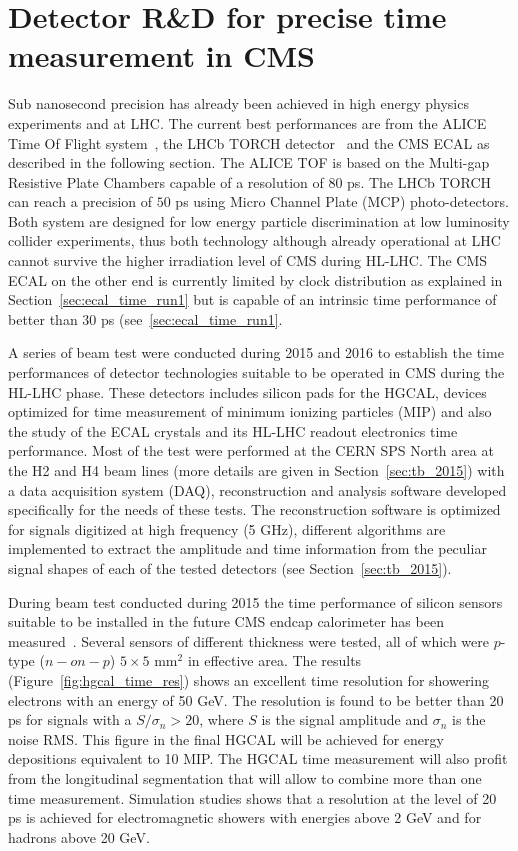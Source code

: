 \clearpage
\section{Detector R\&D for precise time measurement in CMS}
\label{sec:tming_rnd}
Sub nanosecond precision has already been achieved in high energy physics experiments and at LHC.
The current best performances are from the ALICE Time Of Flight system~\cite{alice_tof}, the LHCb TORCH
detector~\cite{lhcb_torch} and the CMS ECAL as described in the following section. The ALICE TOF is
based on the Multi-gap Resistive Plate Chambers capable of a resolution of $80$ ps. The LHCb TORCH
can reach a precision of $50$ ps using Micro Channel Plate (MCP) photo-detectors. Both system are
designed for low energy particle discrimination at low luminosity collider experiments, thus both technology
although already operational at LHC cannot survive the higher irradiation level of CMS during HL-LHC.
The CMS ECAL on the other end is currently limited by clock distribution as explained in Section~\ref{sec:ecal_time_run1}
but is capable of an intrinsic time performance of better than $30$ ps (see~\ref{sec:ecal_time_run1}.

A series of beam test were conducted during 2015 and 2016 to establish the time performances of detector
technologies suitable to be operated in CMS during the HL-LHC phase. These detectors includes silicon
pads for the HGCAL, devices optimized for time measurement of minimum ionizing particles (MIP) and also the study of
the ECAL \PbWO crystals and its HL-LHC readout electronics time performance. Most of the test were performed at
the CERN SPS North area at the H2 and H4 beam lines (more details are given in Section~\ref{sec:tb_2015}) with
a data acquisition system (DAQ), reconstruction and analysis software developed specifically for the needs of
these tests. The reconstruction software is optimized for signals digitized at high frequency (5 GHz),
different algorithms are implemented to extract the amplitude and time information from the peculiar signal shapes of
each of the tested detectors (see Section~\ref{sec:tb_2015}).

During beam test conducted during 2015 the time performance of silicon sensors suitable to be installed
in the future CMS endcap calorimeter has been measured~\cite{hgcal_tb_time}. Several sensors of different
thickness were tested, all of which were $p$-type ($n-on-p$) $5\times 5$ mm$^2$ in effective area.
The results (Figure~\ref{fig:hgcal_time_res}) shows an excellent time resolution for showering electrons with an
energy of 50 GeV. The resolution is found to be better than 20 ps for signals with a $S/\sigma_n > 20$,  where
$S$ is the signal amplitude and $\sigma_n$ is the noise RMS. This figure in the final HGCAL will be achieved for
energy depositions equivalent to 10 MIP. The HGCAL time measurement will also profit from the longitudinal segmentation that will
allow to combine more than one time measurement. Simulation studies shows that a resolution at the level of 20 ps is
achieved for electromagnetic showers with energies above 2 GeV and for hadrons above 20 GeV.

